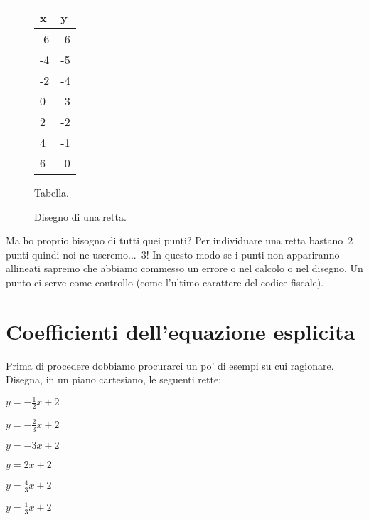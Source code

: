 \begin{inaccessibleblock}
 \begin{figure}[h]
 \centering
 \begin{minipage}[]{.50\textwidth}
  \begin{center}
   \begin{tabular}{l|l}
    x   & y \\
    \hline
    -6 & -6 \\
    -4 & -5 \\
    -2 & -4 \\
     0 & -3 \\
     2 & -2 \\
     4 & -1 \\
     6 & -0
   \end{tabular}
  \end{center}
  \caption{Tabella.}\label{fig:tabella}
 \end{minipage}
 \begin{minipage}[]{.40\textwidth}
   \centering
  \caption{Disegno di una retta.}\label{fig:retta02}
 \end{minipage}
\end{figure}
\end{inaccessibleblock}

Ma ho proprio bisogno di tutti quei punti? Per individuare una retta 
bastano~2 punti quindi noi ne useremo...~3! In questo modo se 
i punti non appariranno allineati sapremo che abbiamo commesso un errore o 
nel calcolo o nel disegno. Un punto ci serve come controllo 
(come l'ultimo carattere del codice fiscale).

\section{Coefficienti dell'equazione esplicita}
\label{sec:retta_coefficienti}

Prima di procedere dobbiamo procurarci un po' di esempi su cui ragionare.
Disegna, in un piano cartesiano, le seguenti rette:

\begin{multicols}{3}
 \TabPositions{0.6cm}
 \begin{enumeratea}
 \item \(y=-\frac{1}{2}x + 2\)
 \item \(y=-\frac{2}{3}x + 2\)
 \item \(y=-{3}x + 2\)
 \item \(y={2}x + 2\)
 \item \(y=\frac{4}{3}x + 2\)
 \item \(y=\frac{1}{3}x + 2\)
 \end{enumeratea}
\end{multicols}

